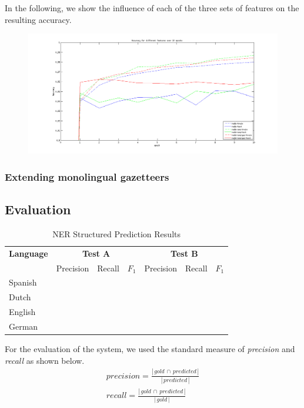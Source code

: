 \documentclass[11pt]{article}
\begin{document}
In the following, we show the influence of each of the three sets of features on the resulting accuracy.
\FloatBarrier
\begin{figure}[t!]
 \includegraphics[scale=0.5]{Plot.png}
\end{figure}


\subsubsection{Extending monolingual gazetteers}



\subsection{Evaluation}

\begin{table}[t]
\centering
\begin{tabular}{| l | l l l| l l l |}

\hline
\bf Language & \multicolumn{3}{c|}{ \bf Test A}&\multicolumn{3}{c|}{ \bf Test B}\\
             & Precision & Recall & $F_1$ & Precision & Recall & $F_1$ \\ \hline
Spanish &       &          &     &          &               & \\
Dutch  &         &          &     &          &               &   \\
English &        &          &     &          &               &       \\
German &      &          &       &          &             & \\
\hline
\end{tabular}
\caption{NER Structured Prediction Results }
\label{table:Results}
\end{table}

For the evaluation of the system, we used the standard measure of \emph{precision} and \emph{recall} as shown below.
\begin{align*}
     precision =  \frac{  |\,gold\,\cap\,predicted\,| }{ |\,predicted\,| } \\
     recall = \frac{ |\,gold\,\cap\,predicted\,| }{ |\,gold\,| }
\end{align*}
\end{document}

